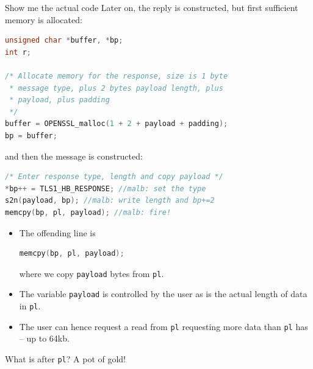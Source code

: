 \documentclass[10pt]{beamer}
\begin{document}
\begin{frame}{Show me the actual code}
Later on, the reply is constructed, but first sufficient memory is allocated:

\begin{lstlisting}[language=c,morekeywords={memcpy,n2s,s2n}]
unsigned char *buffer, *bp;
int r;

/* Allocate memory for the response, size is 1 byte
 * message type, plus 2 bytes payload length, plus
 * payload, plus padding
 */
buffer = OPENSSL_malloc(1 + 2 + payload + padding);
bp = buffer;
\end{lstlisting}

and then the message is constructed:

\begin{lstlisting}[language=c,morekeywords={memcpy,n2s,s2n}]
/* Enter response type, length and copy payload */
*bp++ = TLS1_HB_RESPONSE; //malb: set the type
s2n(payload, bp); //malb: write length and bp+=2
memcpy(bp, pl, payload); //malb: fire!
\end{lstlisting}

\framebreak

\begin{itemize}
  \item The offending line is
\begin{lstlisting}[language=c,morekeywords={memcpy,n2s,s2n}]
memcpy(bp, pl, payload);
\end{lstlisting}
where we copy \texttt{payload} bytes from {\tt pl}.

 \item The variable \texttt{payload} is controlled by the user as is the actual length of data in \texttt{pl}. 
 \item The user can hence request a read from {\tt pl} requesting more data than {\tt pl} has -- up to 64kb. 
\end{itemize}

\vspace{1em}

What is after {\tt pl}? A pot of gold!
\end{frame}
\end{document}
